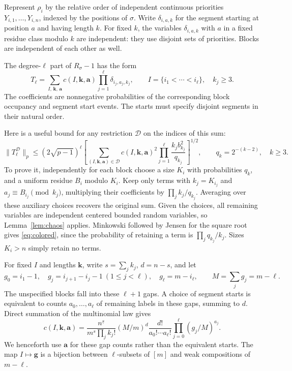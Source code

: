 \documentclass[11pt]{article}
\begin{document}
Represent $\rho_i$ by the relative order of independent continuous
priorities $Y_{i,1},\ldots,Y_{i,n}$, indexed by the positions of $\sigma$.
Write $\delta_{i,a,k}$ for the segment starting at position $a$ and having
length $k$. For fixed $k$, the variables $\delta_{i,a,k}$ with $a$ in a
fixed residue class modulo $k$ are independent: they use disjoint sets of
priorities. Blocks are independent of each other as well.

The degree-$\ell$ part of $R_\sigma-1$ has the form
\[
 T_\ell=\sum_{I,\,\boldsymbol k,\,\boldsymbol a}
       c(I,\boldsymbol k,\boldsymbol a)
       \prod_{j=1}^\ell\delta_{i_j,a_j,k_j},\qquad
 I=\{i_1<\cdots<i_\ell\},\quad k_j\geq3.
\]
The coefficients are nonnegative probabilities of the corresponding block
occupancy and segment start events. The starts must specify disjoint
segments in their natural order.

Here is a useful bound for any restriction $\mathcal D$ on the indices of
this sum:
\begin{equation}\label{eq:colored}
 \|T_\ell^{\mathcal D}\|_p\leq(2\sqrt{p-1})^\ell
 \left[\sum_{(I,\boldsymbol k,\boldsymbol a)\in\mathcal D}
 c(I,\boldsymbol k,\boldsymbol a)^2
          \prod_{j=1}^\ell\frac{k_j b_{k_j}^2}{q_{k_j}}\right]^{1/2},
 \qquad q_k=2^{-(k-2)},\quad k\geq3.
\end{equation}
To prove it, independently for each block choose a size $K_i$ with
probabilities $q_k$, and a uniform residue $B_i$ modulo $K_i$. Keep only
terms with $k_j=K_{i_j}$ and $a_j\equiv B_{i_j}\pmod{k_j}$, multiplying
their coefficients by $\prod_jk_j/q_{k_j}$.
Averaging over these auxiliary choices recovers the original sum.
Given the choices, all remaining variables are independent centered bounded
random variables, so Lemma~\ref{lem:chaos} applies.
Minkowski followed by Jensen for the square root gives \eqref{eq:colored},
since the probability of retaining a term is $\prod_jq_{k_j}/k_j$.
Sizes $K_i>n$ simply retain no terms.

For fixed $I$ and lengths $\boldsymbol k$, write $s=\sum_jk_j$, $d=n-s$,
and let
\[
 g_0=i_1-1,\quad g_j=i_{j+1}-i_j-1\ (1\leq j<\ell),\quad
 g_\ell=m-i_\ell,\qquad M=\sum_jg_j=m-\ell.
\]
The unspecified blocks fall into these $\ell+1$ gaps. A choice of segment
starts is equivalent to counts $a_0,\ldots,a_\ell$ of remaining labels in
these gaps, summing to $d$. Direct summation of the multinomial law gives
\begin{equation}\label{eq:coefficient}
 c(I,\boldsymbol k,\boldsymbol a)
 =\frac{n^{\underline{s}}}{m^s\prod_jk_j!}
       (M/m)^d
       \frac{d!}{a_0!\cdots a_\ell!}
       \prod_{j=0}^\ell(g_j/M)^{a_j}.
\end{equation}
We henceforth use $\boldsymbol a$ for these gap counts rather than the
equivalent starts. The map $I\mapsto\boldsymbol g$ is a bijection between
$\ell$-subsets of $[m]$ and weak compositions of $m-\ell$.
\end{document}
